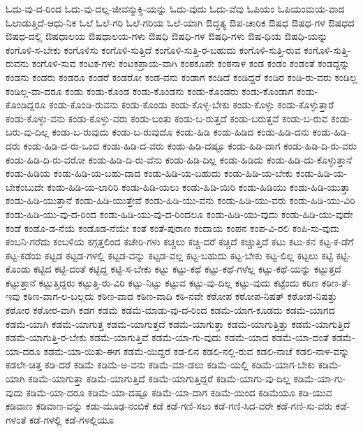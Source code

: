{ಓದು-ವು-ದ-ರಿಂದ
ಓದು-ವು-ದಲ್ಲ-ಜೀವನ್ಮುಕ್ತಿ-ಯನ್ನು
ಓದು-ವುದು
ಓದು-ವೆವು
ಓಪಿಯಂ
ಓಪಿಯಂಮಯ-ವಾದ
ಓಲಾಡುತ್ತಿದೆ-ಆಧು-ನಿಕ
ಓಲೆ
ಓಲೆ-ಗರಿ
ಓಲೆ-ಗರಿಯ
ಓಲೆ-ಯಾಗಿ
ಔದ್ಧತ್ಯ
ಔಪ-ಚಾರಿಕ
ಔಷಧ
ಔಷಧ-ಗಳ
ಔಷಧದ
ಔಷಧ-ದಲ್ಲಿ
ಔಷಧಾಲಯ
ಔಷಧಾಲಯ-ಗಳು
ಔಷಧಿ
ಔಷಧಿ-ಗಳ
ಔಷಧಿ-ಗಳು
ಔಷ-ಧಿಯ
ಔಷಧಿ-ಯನ್ನು
ಕಂಗೊಳಿ-ಸ-ಬೇಕು
ಕಂಗೊಳಿಸು
ಕಂಗೊಳಿ-ಸುತ್ತಿದೆ
ಕಂಗೊಳಿ-ಸುತ್ತಿ-ರ-ಬಹುದು
ಕಂಗೊಳಿ-ಸುತ್ತಿ-ರುವ
ಕಂಗೊಳಿ-ಸುತ್ತಿ-ರುವನು
ಕಂಗೊಳಿ-ಸುವ
ಕಂಟಕ-ಗಳು
ಕಂಟಕಪ್ರಾಯ-ವಾಗಿ
ಕಂಠಕೂಪೇ
ಕಂಠನಾಳ
ಕಂಡ
ಕಂಡಂ
ಕಂಡಂತೆ
ಕಂಡದ್ದನ್ನು
ಕಂಡನು
ಕಂಡರು
ಕಂಡರೂ
ಕಂಡರೆ
ಕಂಡರೋ
ಕಂಡ-ವನು
ಕಂಡಾಗ
ಕಂಡಿದೆ
ಕಂಡಿದ್ದರೆ
ಕಂಡಿರ
ಕಂಡಿ-ರು-ವರು
ಕಂಡಿಲ್ಲ
ಕಂಡಿಲ್ಲ-ವಾ-ದರೂ
ಕಂಡು
ಕಂಡು-ಕೊಂಡ
ಕಂಡು-ಕೊಂಡನು
ಕಂಡು-ಕೊಂಡರು
ಕಂಡು-ಕೊಂಡಾಗ
ಕಂಡು-ಕೊಂಡಿದ್ದರೂ
ಕಂಡು-ಕೊಂಡಿ-ರುವನು
ಕಂಡು-ಕೊಂಡು
ಕಂಡು-ಕೊಳ್ಳ-ಬೇಕು
ಕಂಡು-ಕೊಳ್ಳು
ಕಂಡು-ಕೊಳ್ಳುತ್ತಾರೆ
ಕಂಡು-ಕೊಳ್ಳು-ವನು
ಕಂಡು-ಕೊಳ್ಳು-ವರು
ಕಂಡು-ಬಂತು
ಕಂಡು-ಬ-ರುತ್ತದೆ
ಕಂಡು-ಬರುತ್ತವೆ
ಕಂಡು-ಬ-ರುವ
ಕಂಡು-ಬರು-ವು-ದಿಲ್ಲ
ಕಂಡು-ಬ-ರುವುದು
ಕಂಡು-ಬ-ರುವುದೊ
ಕಂಡು-ಹಿಡಿ
ಕಂಡು-ಹಿಡಿದ
ಕಂಡು-ಹಿಡಿ-ದನು
ಕಂಡು-ಹಿಡಿ-ದರು
ಕಂಡು-ಹಿಡಿ-ದ-ರು-ಒಂದ
ಕಂಡು-ಹಿಡಿ-ದ-ವರು
ಕಂಡು-ಹಿಡಿ-ದಷ್ಟೂ
ಕಂಡು-ಹಿಡಿ-ದಾಗ
ಕಂಡು-ಹಿಡಿ-ದಿ-ರು-ವರು
ಕಂಡು-ಹಿಡಿ-ದಿ-ರು-ವರೋ
ಕಂಡು-ಹಿಡಿ-ದಿ-ರು-ವೆನು
ಕಂಡು-ಹಿಡಿ-ದಿಲ್ಲ
ಕಂಡು-ಹಿಡಿದು
ಕಂಡು-ಹಿಡಿ-ದು-ಕೊಳ್ಳುತ್ತಾನೆ
ಕಂಡು-ಹಿಡಿಯ
ಕಂಡು-ಹಿಡಿ-ಯ-ಬಹು-ದಾದ
ಕಂಡು-ಹಿಡಿ-ಯ-ಬಹುದು
ಕಂಡು-ಹಿಡಿ-ಯ-ಬೇಕು
ಕಂಡು-ಹಿಡಿ-ಯ-ಬೇಕೆಂಬುದೇ
ಕಂಡು-ಹಿಡಿ-ಯ-ಲಾರಿರಿ
ಕಂಡು-ಹಿಡಿ-ಯಲು
ಕಂಡು-ಹಿಡಿ-ಯಿರಿ
ಕಂಡು-ಹಿಡಿಯು
ಕಂಡು-ಹಿಡಿ-ಯುತ್ತಾ
ಕಂಡು-ಹಿಡಿ-ಯುತ್ತಾನೆ
ಕಂಡು-ಹಿಡಿ-ಯುತ್ತೇವೆ
ಕಂಡು-ಹಿಡಿ-ಯು-ವನು
ಕಂಡು-ಹಿಡಿ-ಯು-ವರು
ಕಂಡು-ಹಿಡಿ-ಯು-ವಿರಿ
ಕಂಡು-ಹಿಡಿ-ಯು-ವು-ದ-ರಿಂದ
ಕಂಡು-ಹಿಡಿ-ಯು-ವು-ದ-ರಿಂದಲೂ
ಕಂಡು-ಹಿಡಿ-ಯು-ವುದು
ಕಂಡು-ಹಿಡಿ-ಯು-ವುದೇ
ಕಂಡೆ
ಕಂಡೊ-ಡ-ನೆಯೆ
ಕಂಡೊಡ-ನೆಯೇ
ಕಂತೆ
ಕಂತೆ-ಪುರಾಣ
ಕಂದಾಯ
ಕಂಪನ
ಕಂಪ-ವಿ-ರಲಿ
ಕಂಪಿ-ಸು-ವುದು
ಕಂಬನಿ-ಗರೆದು
ಕಂಬಳಿಯ
ಕಗ್ಗತ್ತಲಿಂದ
ಕಚೇರಿ-ಗಳು
ಕಚ್ಚಲು
ಕಚ್ಚಿ-ದರೆ
ಕಚ್ಚಿದೆ
ಕಚ್ಚುತ್ತಿದೆ
ಕಟು
ಕಟು-ಕನ
ಕಟ್ಟ-ಕ-ಡೆಗೆ
ಕಟ್ಟ-ಕಡೆಯ
ಕಟ್ಟಡ
ಕಟ್ಟಡ-ಗಳಲ್ಲಿ
ಕಟ್ಟಡ-ವನ್ನು
ಕಟ್ಟಡ-ವಲ್ಲ
ಕಟ್ಟ-ಬಹುದು
ಕಟ್ಟ-ಬೇಕು
ಕಟ್ಟ-ಲಿಲ್ಲ
ಕಟ್ಟಲು
ಕಟ್ಟಿ
ಕಟ್ಟಿ-ಕೊಂಡು
ಕಟ್ಟಿದ
ಕಟ್ಟಿ-ದಂತೆ
ಕಟ್ಟಿದ್ದ
ಕಟ್ಟಿ-ಸ-ಬೇಕು
ಕಟ್ಟು
ಕಟ್ಟು-ಕಥೆ
ಕಟ್ಟು-ಕಥೆ-ಗಳೆಲ್ಲ
ಕಟ್ಟು-ಕಥೆ-ಯನ್ನು
ಕಟ್ಟುತ್ತದೆ
ಕಟ್ಟುತ್ತಾನೆ
ಕಟ್ಟುತ್ತಿದ್ದರು
ಕಟ್ಟುತ್ತಿ-ರು-ವಿರಿ
ಕಟ್ಟು-ನಿಟ್ಟು
ಕಟ್ಟುವ
ಕಟ್ಟು-ವು-ದಿಲ್ಲ
ಕಟ್ಟು-ವುದು
ಕಟ್ಟೆಂದು
ಕಠಿಣ
ಕಠಿಣ-ತೆ-ಇವು
ಕಠಿಣ-ವಾಗ-ಲ-ಬಲ್ಲದು
ಕಠಿಣ-ವಾದ
ಕಠಿಣ-ವಾದಿ
ಕಠಿ-ನವೇ
ಕಠೋಪ
ಕಠೋಪ-ನಿಷತ್
ಕಠೋಪ-ನಿಷತ್ತು
ಕಠೋರ
ಕಠೋರ-ವಾಗಿ
ಕಡಗ
ಕಡಮೆ
ಕಡಮೆ-ಮಾಡು-ವು-ದ-ರಿಂದ
ಕಡಮೆ-ಯಾಗ-ಕೂಡದು
ಕಡಮೆ-ಯಾಗದ
ಕಡಮೆ-ಯಾಗಿ
ಕಡಮೆ-ಯಾಗುತ್ತ
ಕಡಮೆ-ಯಾಗುತ್ತದೆ
ಕಡಮೆ-ಯಾಗುತ್ತಾ
ಕಡಮೆ-ಯಾಗುತ್ತಿತ್ತು
ಕಡಮೆ-ಯಾಗುತ್ತಿದೆ
ಕಡಮೆ-ಯಾಗುತ್ತಿ-ರ-ಬೇಕು
ಕಡಮೆ-ಯಾಗುತ್ತಿವೆ
ಕಡಮೆ-ಯಾ-ಗು-ವುದು
ಕಡಮೆ-ಯಾದ
ಕಡಮೆ-ಯಾ-ದಂತೆ
ಕಡಮೆ-ಯಾ-ದರೂ
ಕಡಮೆ-ಯಾ-ಯಿತು-ಈಗ
ಕಡಮೆ-ಯಿದ್ದರೆ
ಕಡ-ಲಿನ
ಕಡಲಿ-ನಲ್ಲಿ-ರುವ
ಕಡಲಿ-ನಾಚೆ
ಕಡಲಿ-ನಾಳ-ವನ್ನು
ಕಡಲೇ-ಚಿತ್ತ
ಕಡಿ-ದರೆ
ಕಡಿಮೆ
ಕಡಿಮೆ-ಅ-ವನು
ಕಡಿಮೆ-ಮಾ-ಡಲು
ಕಡಿಮೆ-ಯಲ್ಲಿ
ಕಡಿಮೆ-ಯಾಗ-ಬೇಕು
ಕಡಿಮೆ-ಯಾಗಿ
ಕಡಿಮೆ-ಯಾಗುತ್ತಾ
ಕಡಿಮೆ-ಯಾಗುತ್ತಿದೆ
ಕಡಿಮೆ-ಯಾಗುತ್ತಿದ್ದರೆ
ಕಡಿಮೆ-ಯಾಗು-ವು-ದಿಲ್ಲ
ಕಡಿಮೆ-ಯಾ-ಗು-ವುದು
ಕಡಿಮೆ-ಯಾ-ದರೂ
ಕಡಿಮೆ-ಯಾ-ದಷ್ಟೂ
ಕಡಿಮೆ-ಯಾ-ದಾಗ
ಕಡಿಮೆ-ಯಿಂದ
ಕಡಿಮೆಯೂ
ಕಡಿ-ಯುವ
ಕಡಿವಾಣ
ಕಡಿವಾಣ-ವನ್ನು
ಕಡು-ಮೂಢ-ನಂಬಿಕೆ
ಕಡೆ
ಕಡೆ-ಗಣಿ-ಸಲು
ಕಡೆ-ಗಣಿ-ಸಿದ-ವರೇ
ಕಡೆ-ಗಣಿ-ಸು-ವರು
ಕಡೆ-ಗಳಂತೆ
ಕಡೆ-ಗಳಲ್ಲಿ
ಕಡೆ-ಗಳಲ್ಲಿಯೂ
}

